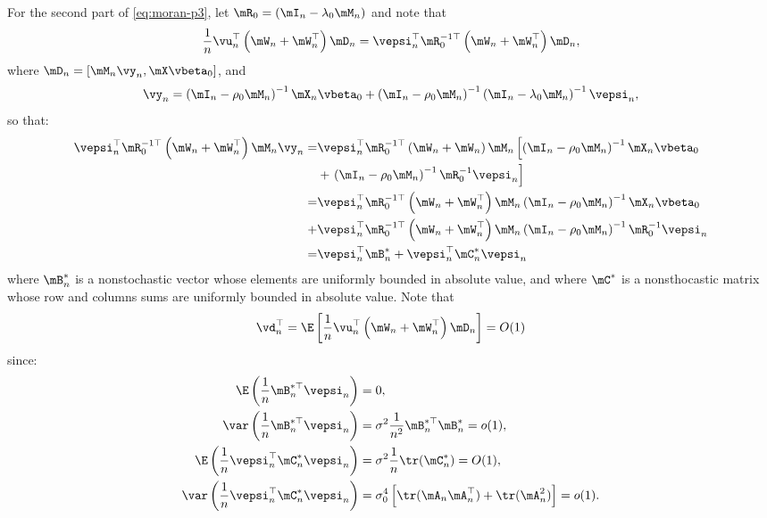 \documentclass[english,12pt]{book}\usepackage[]{graphicx}\usepackage[]{xcolor}
\begin{document}
\begin{subappendices}
For the second part of \eqref{eq:moran-p3}, let $\mR_0 = (\mI_n - \lambda_0 \mM_n)$ and note that
\begin{equation*}
\frac{1}{n}\vu_n^\top\left(\mW_n + \mW_n^\top\right)\mD_n =\vepsi_n^\top\mR_0^{-1\top}\left(\mW_n + \mW_n^\top\right)\mD_n, 
\end{equation*}
%
where $\mD_n = \left[\mM_n\vy_n, \mX\vbeta_0\right]$, and 
\begin{equation*}
\vy_n = \left(\mI_n-\rho_0\mM_n\right)^{-1}\mX_n\vbeta_0 + \left(\mI_n-\rho_0\mM_n\right)^{-1}\left(\mI_n-\lambda_0\mM_n\right)^{-1}\vepsi_n, 
\end{equation*}
so that:
\begin{equation*}
\begin{aligned}
  \vepsi_n^\top\mR_0^{-1\top}\left(\mW_n + \mW_n^\top\right)\mM_n\vy_n  = & \vepsi_n^\top\mR_0^{-1\top}\left(\mW_n + \mW_n\right)\mM_n\left[\left(\mI_n-\rho_0\mM_n\right)^{-1}\mX_n\vbeta_0 \right. \\
  & + \left.\left(\mI_n-\rho_0\mM_n\right)^{-1}\mR_0^{-1}\vepsi_n\right] \\
= & \vepsi_n^\top\mR_0^{-1\top}\left(\mW_n + \mW_n^\top\right)\mM_n\left(\mI_n-\rho_0\mM_n\right)^{-1}\mX_n\vbeta_0 \\
 + & \vepsi_n^\top\mR_0^{-1\top}\left(\mW_n + \mW_n^\top\right)\mM_n\left(\mI_n-\rho_0\mM_n\right)^{-1}\mR_0^{-1}\vepsi_n \\
 = & \vepsi_n^\top\mB^*_n + \vepsi_n^\top\mC^*_n\vepsi_n
  \end{aligned}
\end{equation*}
%
where $\mB_n^*$ is a nonstochastic vector whose elements are uniformly bounded in absolute value, and where $\mC^*$ is a nonsthocastic matrix whose row and columns sums are uniformly bounded in absolute value. Note that 
\begin{equation}\label{eq:moran-p4}
\vd_n^\top = \E\left[\frac{1}{n}\vu_n^\top\left(\mW_n + \mW_n^\top\right)\mD_n\right] = O(1)
\end{equation}
%
since:
\begin{equation*}
  \begin{aligned}
    \E\left(\frac{1}{n}\mB^{*\top}_n\vepsi_n\right) &= 0, \\
    \var\left(\frac{1}{n}\mB^{*\top}_n\vepsi_n\right) &= \sigma^2\frac{1}{n^2}\mB^{*\top}_n\mB^{*}_n = o(1), \\
    \E\left(\frac{1}{n}\vepsi_n^\top\mC^*_n\vepsi_n\right) &= \sigma^2\frac{1}{n}\tr(\mC_n^*) = O(1),\\
     \var\left(\frac{1}{n}\vepsi_n^\top\mC^*_n\vepsi_n\right) &= \sigma^4_0\left[\tr(\mA_n\mA_n^\top)+\tr(\mA^2_n)\right] = o(1).
  \end{aligned}
\end{equation*}


\end{subappendices}
\end{document}
